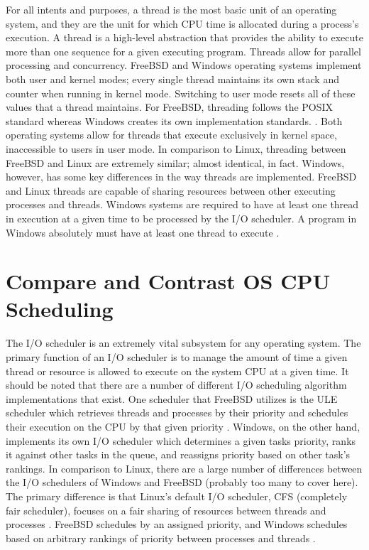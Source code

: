 \documentclass[letterpaper,10pt,draftclsnofoot,onecolumn]{IEEEtran}
\begin{document}
For all intents and purposes, a thread is the most basic unit of an operating system, and they are the unit for which CPU time is allocated during a process’s execution. A thread is a high-level abstraction that provides the ability to execute more than one sequence for a given executing program. Threads allow for parallel processing and concurrency. FreeBSD and Windows operating systems implement both user and kernel modes; every single thread maintains its own stack and counter when running in kernel mode. Switching to user mode resets all of these values that a thread maintains. For FreeBSD, threading follows the POSIX standard whereas Windows creates its own implementation standards. \cite{MSWindows1} \cite{FreeBSD2}. Both operating systems allow for threads that execute exclusively in kernel space, inaccessible to users in user mode.
In comparison to Linux, threading between FreeBSD and Linux are extremely similar; almost identical, in fact. Windows, however, has some key differences in the way threads are implemented. FreeBSD and Linux threads are capable of sharing resources between other executing processes and threads. Windows systems are required to have at least one thread in execution at a given time to be processed by the I/O scheduler. A program in Windows absolutely must have at least one thread to execute \cite{MSWindows1}.\\


\section{Compare and Contrast OS CPU Scheduling}
The I/O scheduler is an extremely vital subsystem for any operating system. The primary function of an I/O scheduler is to manage the amount of time a given thread or resource is allowed to execute on the system CPU at a given time. It should be noted that there are a number of different I/O scheduling algorithm implementations that exist. One scheduler that FreeBSD utilizes is the ULE scheduler which retrieves threads and processes by their priority and schedules their execution on the CPU by that given priority \cite{FreeBSD1}. Windows, on the other hand, implements its own I/O scheduler which determines a given tasks priority, ranks it against other tasks in the queue, and reassigns priority based on other task’s rankings.
In comparison to Linux, there are a large number of differences between the I/O schedulers of Windows and FreeBSD (probably too many to cover here). The primary difference is that Linux’s default I/O scheduler, CFS (completely fair scheduler), focuses on a fair sharing of resources between threads and processes \cite{Linux}. FreeBSD schedules by an assigned priority, and Windows schedules based on arbitrary rankings of priority between processes and threads \cite{MSWindows1} \cite{FreeBSD1}.\\
\end{document}
